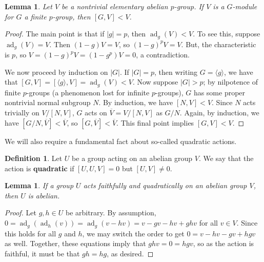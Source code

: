 \documentclass[a4paper, 11pt]{amsart}
\theoremstyle{plain}
\newtheorem{lemma}[theorem]{Lemma}
\theoremstyle{definition}
\newtheorem{definition}[theorem]{Definition}
\theoremstyle{remark}
\DeclareMathOperator{\ad}{ad}
\begin{document}
\begin{lemma}\label{l.primality}
Let $V$ be a nontrivial elementary abelian $p$-group. If 
 $V$ is a $G$-module for $G$ a finite $p$-group, then $[G,V] < V$.
\end{lemma}
\begin{proof}
The main point is that if $|g|=p$, then $\ad_g(V) <V$. To see this, suppose $\ad_g(V) = V$. Then $(1-g)V = V$, so $(1-g)^pV = V$. But, the characteristic is $p$, so $V = (1-g)^pV = (1-g^p)V = 0$, a contradiction.

We now proceed by induction on $|G|$. If $|G|=p$, then  writing $G = \langle g \rangle$, we have that $[G,V] = [\langle g \rangle,V] = \ad_g(V) <V$.  Now suppose $|G|>p$; by nilpotence of finite $p$-groups (a phenomenon lost for infinite $p$-groups), $G$ has some proper nontrivial normal subgroup $N$. By induction, we have $[N,V] < V$. Since $N$ acts trivially on $V/[N,V]$,  $G$ acts on  $\overline{V} = V/[N,V]$ as $G/N$. Again, by induction, we have $[G/N,\overline{V}] < \overline{V}$, so $[G,\overline{V}] < \overline{V}$. This final point implies $[G,V] < V$.
\end{proof}

We will also require a fundamental fact about so-called quadratic actions. 

\begin{definition}
Let $U$ be a group acting on an abelian group $V$.
We say that the action is \textbf{quadratic} if $[U,U,V] = 0$ but  $[U,V] \neq 0$. %
\end{definition}

\begin{lemma}\label{l.Quadratic}
If a group $U$ acts faithfully and quadratically on an abelian group $V$, then $U$ is abelian. %
\end{lemma}
\begin{proof}
    Let $g,h\in U$ be arbitrary. By assumption,  $0 = \ad_g(\ad_h(v)) = \ad_g(v - h v) =    v-g v - h v + gh v$ for all $v\in V$. Since this holds for all $g$ and $h$, we may switch the order to get $0 = v - h v - g v +hg v$ as well. Together, these  equations imply that $gh v = 0 = hg v$, so as the action is faithful, it must be that $gh = hg$, as desired.
\end{proof}

\end{document}
